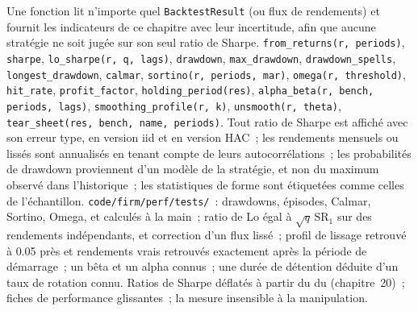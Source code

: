 \begin{build}
 Une fonction lit n'importe quel \texttt{BacktestResult} (ou flux de rendements) et fournit les indicateurs de ce chapitre avec leur incertitude, afin que
aucune stratégie ne soit jugée sur son seul ratio de Sharpe.
 \texttt{from\_returns(r, periods)}, \texttt{sharpe}, \texttt{lo\_sharpe(r, q, lags)}, \texttt{drawdown}, \texttt{max\_drawdown},
\texttt{drawdown\_spells}, \texttt{longest\_drawdown}, \texttt{calmar}, \texttt{sortino(r, periods, mar)}, \texttt{omega(r, threshold)}, \texttt{hit\_rate},
\texttt{profit\_factor}, \texttt{holding\_period(res)}, \texttt{alpha\_beta(r, bench, periods, lags)}, \texttt{smoothing\_profile(r, k)},
\texttt{unsmooth(r, theta)}, \texttt{tear\_sheet(res, bench, name, periods)}.
 Tout ratio de Sharpe est affiché avec son erreur type, en version iid et en version HAC~; les rendements mensuels ou lissés sont annualisés en tenant compte de leurs autocorrélations~;
les probabilités de drawdown proviennent d'un modèle de la stratégie, et non du maximum observé dans l'historique~; les statistiques de forme sont étiquetées comme celles de l'échantillon.
 \texttt{code/firm/perf/tests/}~: drawdowns, épisodes, Calmar, Sortino, Omega,  et  calculés à la main~; ratio de Lo égal à
$\sqrt q\,\mathrm{SR}_1$ sur des rendements indépendants, et correction d'un flux lissé~; profil de lissage retrouvé à 0.05 près et rendements vrais retrouvés
exactement après la période de démarrage~; un bêta et un alpha connus~; une durée de détention déduite d'un taux de rotation connu.
 Ratios de Sharpe déflatés à partir du  du  (chapitre~20)~; fiches de performance glissantes~; la mesure insensible à la manipulation.
\end{build}

